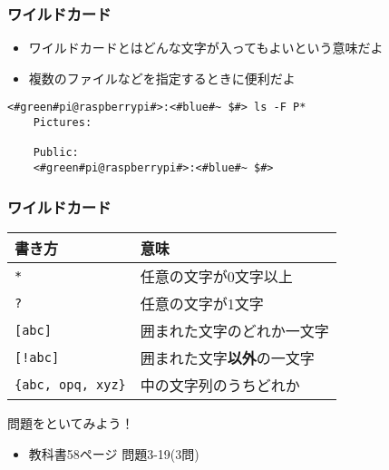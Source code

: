 \begin{frame}[fragile]
    \frametitle{ワイルドカード}
    \begin{itemize}
        \item ワイルドカードとはどんな文字が入ってもよいという意味だよ
        \item 複数のファイルなどを指定するときに便利だよ
    \end{itemize}
    \begin{lstlisting}[title=ワイルドカードの使い方の例]
    <#green#pi@raspberrypi#>:<#blue#~ $#> ls -F P*
    Pictures:
            
    Public:
    <#green#pi@raspberrypi#>:<#blue#~ $#>
    \end{lstlisting}
\end{frame}

\begin{frame}
    \frametitle{ワイルドカード}
    \begin{tabular}{ll} \hline
        書き方 & 意味 \\ \hline
        \texttt{*} & 任意の文字が0文字以上 \\
        \texttt{?}      & 任意の文字が1文字 \\
        \texttt{[abc]}  & 囲まれた文字のどれか一文字\\
        \texttt{[!abc]} & 囲まれた文字{\bf 以外}の一文字\\
        \texttt{\{abc, opq, xyz\}} & 中の文字列のうちどれか\\ \hline
    \end{tabular}
\end{frame}

\begin{frame}
    \begin{exampleblock}{問題をといてみよう！}
        \begin{itemize}
            \item 教科書58ページ 問題3-19(3問)
        \end{itemize}
    \end{exampleblock} 
\end{frame}

